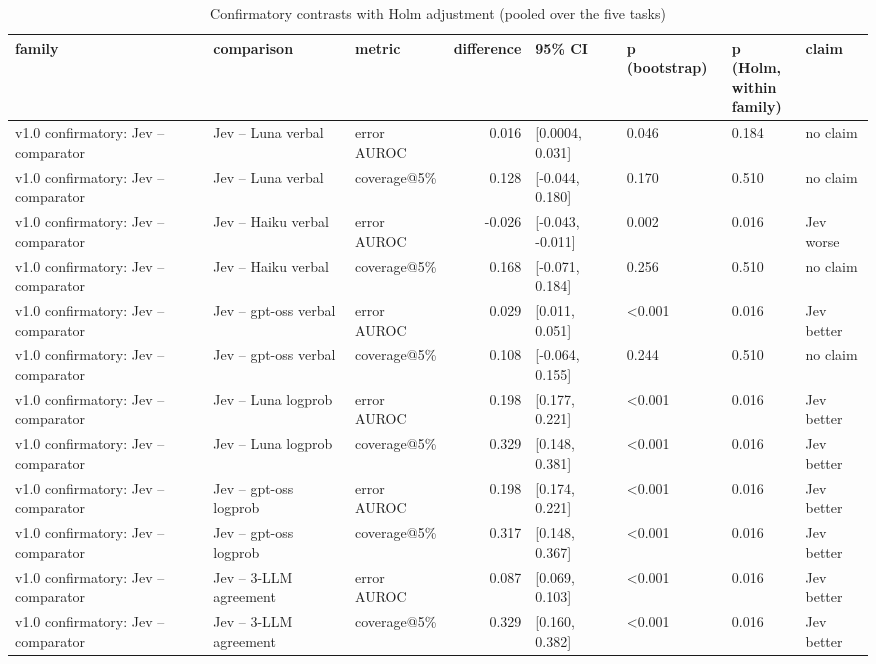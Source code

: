 \begin{table}[t]
\centering
\small
\caption{Confirmatory contrasts with Holm adjustment (pooled over the five tasks)}
\label{tab:tab04_claims}
\begin{adjustbox}{max width=\linewidth}
\begin{tabular}{lllrllll}
\toprule
family & comparison & metric & difference & 95\% CI & p (bootstrap) & \makecell[bl]{p (Holm, \\{} within \\{} family)} & claim \\
\midrule
v1.0 confirmatory: Jev -- comparator & Jev -- Luna verbal & error AUROC & 0.016 & [0.0004, 0.031] & 0.046 & 0.184 & no claim \\
v1.0 confirmatory: Jev -- comparator & Jev -- Luna verbal & coverage@5\% & 0.128 & [-0.044, 0.180] & 0.170 & 0.510 & no claim \\
v1.0 confirmatory: Jev -- comparator & Jev -- Haiku verbal & error AUROC & -0.026 & [-0.043, -0.011] & 0.002 & 0.016 & Jev worse \\
v1.0 confirmatory: Jev -- comparator & Jev -- Haiku verbal & coverage@5\% & 0.168 & [-0.071, 0.184] & 0.256 & 0.510 & no claim \\
v1.0 confirmatory: Jev -- comparator & Jev -- gpt-oss verbal & error AUROC & 0.029 & [0.011, 0.051] & <0.001 & 0.016 & Jev better \\
v1.0 confirmatory: Jev -- comparator & Jev -- gpt-oss verbal & coverage@5\% & 0.108 & [-0.064, 0.155] & 0.244 & 0.510 & no claim \\
v1.0 confirmatory: Jev -- comparator & Jev -- Luna logprob & error AUROC & 0.198 & [0.177, 0.221] & <0.001 & 0.016 & Jev better \\
v1.0 confirmatory: Jev -- comparator & Jev -- Luna logprob & coverage@5\% & 0.329 & [0.148, 0.381] & <0.001 & 0.016 & Jev better \\
v1.0 confirmatory: Jev -- comparator & Jev -- gpt-oss logprob & error AUROC & 0.198 & [0.174, 0.221] & <0.001 & 0.016 & Jev better \\
v1.0 confirmatory: Jev -- comparator & Jev -- gpt-oss logprob & coverage@5\% & 0.317 & [0.148, 0.367] & <0.001 & 0.016 & Jev better \\
v1.0 confirmatory: Jev -- comparator & Jev -- 3-LLM agreement & error AUROC & 0.087 & [0.069, 0.103] & <0.001 & 0.016 & Jev better \\
v1.0 confirmatory: Jev -- comparator & Jev -- 3-LLM agreement & coverage@5\% & 0.329 & [0.160, 0.382] & <0.001 & 0.016 & Jev better \\

\end{tabular}
\end{adjustbox}
\end{table}
